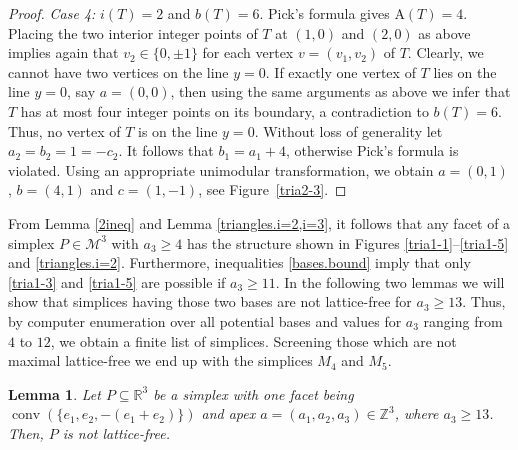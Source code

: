 \documentclass[a4paper]{article}
\theoremstyle{plain}
\newtheorem{lemma}[nn]{Lemma}
\begin{document}
\begin{proof}
\emph{Case 4:} $i(T) = 2$ and $b(T) = 6$.
Pick's formula gives ${\mathrm{A}}(T) = 4$.
Placing the two interior integer points of $T$ at $(1,0)$
and $(2,0)$ as above implies again that $v_2 \in \{0, \pm
1\}$ for each vertex $v = (v_1, v_2)$ of $T$.
Clearly, we cannot have two vertices on the line $y = 0$.
If exactly one vertex of $T$ lies on the line $y = 0$, say
$a = (0,0)$, then using the same arguments as above we infer
that $T$ has at most four integer points on its boundary, a
contradiction to $b(T) = 6$.
Thus, no vertex of $T$ is on the line $y = 0$.
Without loss of generality let $a_2 = b_2 = 1 = - c_2$.
It follows that $b_1 = a_1 + 4$, otherwise Pick's formula is
violated.
Using an appropriate unimodular transformation, we obtain
$a = (0,1)$, $b = (4,1)$ and $c = (1,-1)$, see
Figure~\ref{tria2-3}.
\end{proof}

From Lemma \ref{2ineq} and Lemma \ref{triangles.i=2,i=3},
it follows that any facet of a simplex $P \in {\mathcal{M}^3}$ with
$a_3 \geq 4$ has the structure shown in Figures
\ref{tria1-1}--\ref{tria1-5} and \ref{triangles.i=2}.
Furthermore, inequalities \eqref{bases.bound} imply that
only \ref{tria1-3} and \ref{tria1-5} are possible if $a_3
\geq 11$.
In the following two lemmas we will show that simplices
having those two bases are not lattice-free for $a_3 \geq
13$.
Thus, by computer enumeration over all potential bases and
values for $a_3$ ranging from $4$ to $12$, we obtain a
finite list of simplices.
Screening those which are not maximal lattice-free we end up
with the simplices $M_4$ and $M_5$.

\begin{lemma} \label{simpl.kite}
Let $P \subseteq {\mathbb{R}}^3$ be a simplex with one facet being
${{\mathop{\mathrm{{conv}}}}}(\{e_1, e_2, -(e_1 + e_2)\})$ and apex $a = (a_1, a_2,
a_3) \in {\mathbb{Z}}^3$, where $a_3 \geq 13$. Then, $P$ is not
lattice-free.
\end{lemma}
\end{document}
